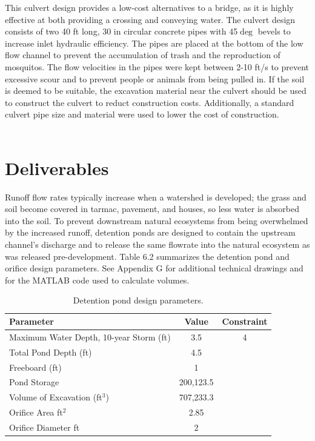 \documentclass[11pt,letterpaper,final]{report}
\begin{document}
\begin{flushleft}
This culvert design provides a low-cost alternatives to a bridge, as it is highly effective at both providing a crossing and conveying water. The culvert design consists of two 40 ft long, 30 in circular concrete pipes with 45$\deg$ bevels to increase inlet hydraulic efficiency. The pipes are placed at the bottom of the low flow channel to prevent the accumulation of trash and the reproduction of mosquitos. The flow velocities in the pipes were kept between 2-10 ft/s to prevent excessive scour and to prevent people or animals from being pulled in. If the soil is deemed to be suitable, the excavation material near the culvert should be used to construct the culvert to reduct construction costs. Additionally, a standard culvert pipe size and material were used to lower the cost of construction. \\~\\



\setcounter{figure}{0}
\setcounter{section}{0}
\setcounter{equation}{0}
\setcounter{table}{0}
\chapter{Deliverables}
Runoff flow rates typically increase when a watershed is developed; the grass and soil become covered in tarmac, pavement, and houses, so less water is absorbed into the soil. To prevent downstream natural ecosystems from being overwhelmed by the increased runoff, detention ponds are designed to contain the upstream channel's discharge and to release the same flowrate into the natural ecosystem as was released pre-development. Table 6.2 summarizes the detention pond and orifice design parameters. See Appendix G for additional technical drawings and for the MATLAB code used to calculate volumes.

\begin{table}[H]
    \centering
    \caption{Detention pond design parameters.}
    \begin{tabular}{lcc}
\textbf{Parameter}&\textbf{Value}&\textbf{Constraint}\\ \hline
Maximum Water Depth, 10-year Storm (ft) & 3.5 & 4 \\
Total Pond Depth (ft) & 4.5  & \\
Freeboard (ft) & 1 &  \\
Pond Storage & 200,123.5 & \\ 
Volume of Excavation (ft$^3$) & 707,233.3 & \\
Orifice Area ft$^2$& 2.85 &\\
Orifice Diameter ft & 2 & \\ \hline


\end{tabular}
\end{table}
\end{flushleft}
\end{document}
